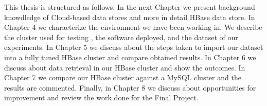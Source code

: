 \bigskip

This thesis is structured as follows. In the next Chapter we present background knowdledge of Cloud-based data stores and more in detail HBase data store. In Chapter 4 we characterize the environment we have been working in. We describe the cluster used for testing , the software deployed, and the dataset of our experiments. In Chapter 5 we discuss about the steps taken to import our dataset into a fully tuned HBase cluster and compare obtained results. In Chapter 6 we discuss about data retrieval in our HBase cluster and show the outcomes. In Chapter 7 we compare our HBase cluster against a MySQL cluster and the results are commented. Finally, in Chapter 8 we discuss about opportunities for improvement and review the work done for the Final Project.

